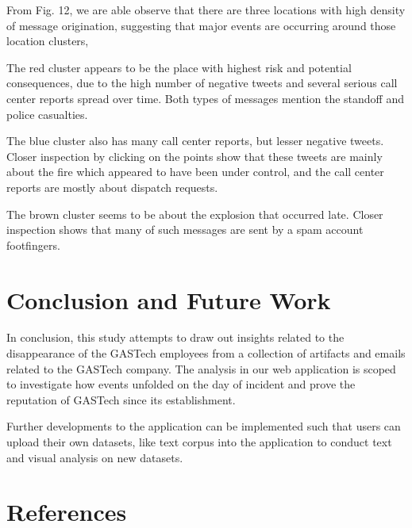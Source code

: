 \documentclass{acm_proc_article-sp}
\begin{document}
From Fig. 12, we are able observe that there are three locations with
high density of message origination, suggesting that major events are
occurring around those location clusters,

The red cluster appears to be the place with highest risk and potential
consequences, due to the high number of negative tweets and several
serious call center reports spread over time. Both types of messages
mention the standoff and police casualties.

The blue cluster also has many call center reports, but lesser negative
tweets. Closer inspection by clicking on the points show that these
tweets are mainly about the fire which appeared to have been under
control, and the call center reports are mostly about dispatch requests.

The brown cluster seems to be about the explosion that occurred late.
Closer inspection shows that many of such messages are sent by a spam
account footfingers.

\hypertarget{conclusion-and-future-work}{%
\section{Conclusion and Future Work}\label{conclusion-and-future-work}}

In conclusion, this study attempts to draw out insights related to the
disappearance of the GASTech employees from a collection of artifacts
and emails related to the GASTech company. The analysis in our web
application is scoped to investigate how events unfolded on the day of
incident and prove the reputation of GASTech since its establishment.

Further developments to the application can be implemented such that
users can upload their own datasets, like text corpus into the
application to conduct text and visual analysis on new datasets.

\hypertarget{references}{%
\section{References}\label{references}}
\setlength{\parindent}{0in}
\end{document}
